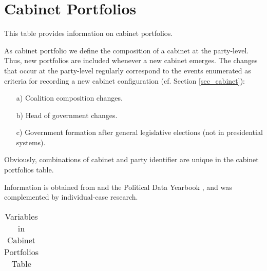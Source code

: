 \section{Cabinet Portfolios}\label{sec_cabinet_portfolios}
This table provides information on cabinet portfolios. 

As cabinet portfolio we define the composition of a cabinet at the party-level.
Thus, new portfolios are included whenever a new cabinet emerges.
The changes that occur at the party-level regularly correspond to the events enumerated as criteria for recording a new cabinet configuration (cf. Section \ref{sec_cabinet}):
\begin{itemize}%
\item[a)] Coalition composition changes.
\item[b)] Head of government changes.
\item[c)] Government formation after general legislative elections (not in presidential systems).
\end{itemize}
Obviously, combinations of cabinet and party identifier are unique in the cabinet portfolios table.

Information is obtained from \citet*{Woldendrop_et_al2000} and the Political Data Yearbook \citeyearpar{EJPR_PDY}, and was complemented by individual-case research.



\begin{center}
\begin{longtable}{L{4cm} L{6cm} L{3cm}}
\caption{Variables in Cabinet Portfolios Table\label{tab_cabinet_portfolios}}


\end{longtable}
\end{center}


